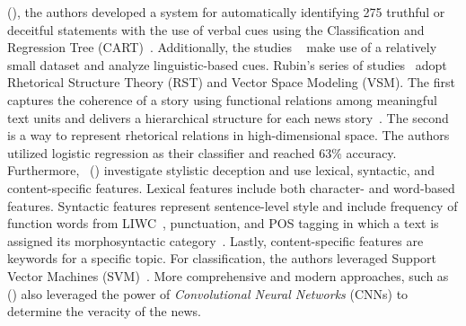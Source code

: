 \begin{description}
\begin{itemize}
(\citeyear{VerificatoinAndImplementationofLBDeceptionIndicators_Bachenko}), the authors developed a system for automatically identifying 275 truthful or deceitful statements with the use of verbal cues using the Classification and Regression Tree (CART)~\parencite{ClassificationRegressioniTrees_Breiman}. Additionally, the studies ~\parencite{OnLyingAndBeingLiedTo_Hancock, OnDeceptionAndDeceptionDetection_Rubin} make use of a relatively small dataset and analyze linguistic-based cues. Rubin’s series of  studies~\parencite{OnDeceptionAndDeceptionDetection_Rubin, IdentificationOfTruth_Rubin, TruthAndDeception_Rubin, TowardsNewsVerification_Rubin} adopt Rhetorical Structure Theory (RST) and Vector Space Modeling (VSM). The first captures the coherence of a story using functional relations among meaningful text units and delivers a hierarchical structure for each news story~\parencite{RST_William}. The second is a way to represent rhetorical relations in high-dimensional space. The authors utilized logistic regression as their classifier and reached 63\% accuracy.\\Furthermore,~\citeauthor{DetectingHoaxesFraudsAndDeception_Afroz} (\citeyear{DetectingHoaxesFraudsAndDeception_Afroz}) investigate stylistic deception and use lexical, syntactic, and content-specific features. Lexical features include both character- and word-based features. Syntactic features represent sentence-level style and include frequency of function words from LIWC~\parencite{LIWC2007_Pennebaker}, punctuation, and POS tagging in which a text is assigned its morphosyntactic category~\parencite{POS_Daelemans}. Lastly, content-specific features are keywords for a specific topic. For classification, the authors leveraged Support Vector Machines (SVM)~\parencite{SVM_Hearst}. More comprehensive and modern approaches, such as~\citeauthor{LiarLiarPantsOnFire_Wang} (\citeyear{LiarLiarPantsOnFire_Wang}) also leveraged the power of \emph{Convolutional Neural Networks} (CNNs) to determine the veracity of the news.

\end{itemize}
\end{description}
